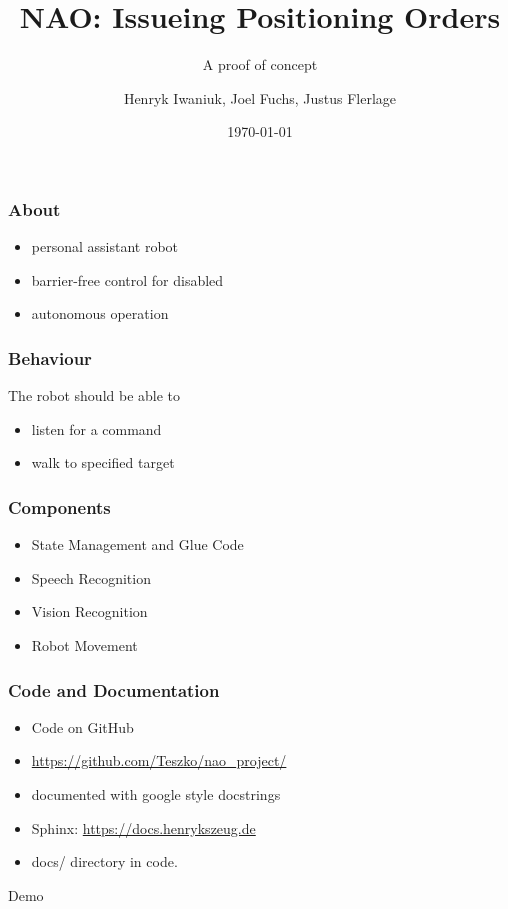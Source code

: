 \documentclass{beamer}
\title{NAO: Issueing Positioning Orders}
\subtitle{A proof of concept}
\author{Henryk Iwaniuk, Joel Fuchs, Justus Flerlage}
\date{\today}
\institute{https://github.com/Teszko/nao\_project}
\begin{document}
\maketitle

\begin{frame}
  \frametitle{About}
  \begin{itemize}
	\item personal assistant robot
	\item barrier-free control for disabled
        \item autonomous operation
  \end{itemize}
\end{frame}

\begin{frame}
  \frametitle{Behaviour}
  The robot should be able to
  \begin{itemize}
  \item listen for a command
  \item walk to specified target
  \end{itemize}
\end{frame}

\begin{frame}
  \frametitle{Components}
  \begin{itemize}
  \item State Management and Glue Code
  \item Speech Recognition
  \item Vision Recognition
  \item Robot Movement
  \end{itemize}
\end{frame}

\begin{frame}
  \frametitle{Code and Documentation}
  \begin{itemize}
  \item Code on GitHub 
  \item \url{https://github.com/Teszko/nao_project/}
  \item documented with google style docstrings
  \item Sphinx: \url{https://docs.henrykszeug.de}
  \item docs/ directory in code.
  \end{itemize}
\end{frame}

\begin{frame}[c]
  \begin{center}
    \Huge Demo
  \end{center}
\end{frame}
\end{document}
